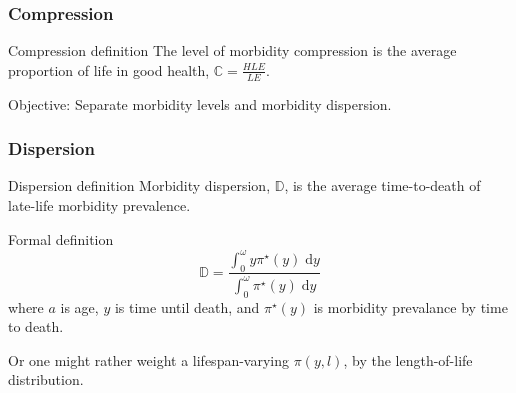 \documentclass[20pt]{beamer}
\newcommand{\dd}{\; \mathrm{d}}
\begin{document}
\begin{frame}
\frametitle{Compression}
\begin{block}{Compression definition}
The level of morbidity compression is the average proportion of life in good
health, $\mathbb{C} = \frac{HLE}{LE}$.
\end{block}


\pause
\begin{block}{Objective:}
Separate morbidity levels and morbidity dispersion.
\end{block}
\end{frame}

\begin{frame}
\frametitle{Dispersion}
\begin{block}{Dispersion definition}
Morbidity dispersion, $\mathbb{D}$, is the average time-to-death of late-life
morbidity prevalence.
\end{block}
\pause

\begin{block}{Formal definition}
\begin{equation}
\mathbb{D} = \frac{\int_0^{\omega} y \pi^\star(y) \dd
y}{\int_0^{\omega}\pi^\star(y)\dd y}
\end{equation}
where $a$ is age, $y$ is time until death, and $\pi^\star(y)$ is morbidity
prevalance by time to death.
\end{block}

\pause
Or one might rather weight a lifespan-varying $\pi(y,l)$, by the length-of-life
distribution.

\end{frame}
\end{document}
